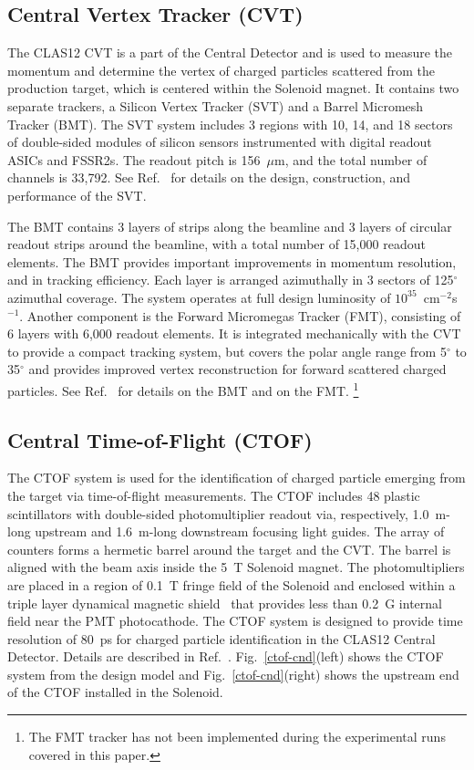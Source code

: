 \documentclass[final,3p,twocolumn]{elsarticle}
\begin{document}
\subsection{Central Vertex Tracker (CVT)}

The CLAS12 CVT is a part of the Central Detector and is used to measure the momentum and determine the vertex of
charged particles scattered from the production target, which is centered within the Solenoid magnet. It contains two
separate trackers, a Silicon Vertex Tracker (SVT) and a Barrel Micromesh Tracker  (BMT). The SVT system includes
3 regions with 10, 14, and 18 sectors of double-sided modules of silicon sensors instrumented with digital readout ASICs
and FSSR2s. The readout pitch is 156~$\mu$m, and the total number of channels is 33,792. See Ref.~\cite{SVT} for
details on the design, construction, and performance of the SVT.

The BMT contains 3 layers of strips along the beamline and 3 layers of circular readout strips around the beamline, with
a total number of 15,000 readout elements. The BMT provides important improvements in momentum resolution, and in
tracking efficiency. Each layer is arranged azimuthally in 3 sectors of 125$^\circ$ azimuthal coverage. The system
operates at full design luminosity of $10^{35}$~cm$^{-2}$s$^{-1}$. Another component is the Forward Micromegas Tracker
(FMT), consisting of 6 layers with 6,000 readout elements. It  is integrated mechanically with the CVT to provide a compact
tracking system, but covers the polar angle range from 5$^\circ$ to 35$^\circ$ and provides improved vertex reconstruction
for forward scattered charged particles. See Ref.~\cite{BMT} for details on the BMT and on the FMT. \footnote{The FMT tracker has not been implemented during the experimental runs covered in this paper.}  



\subsection{Central Time-of-Flight (CTOF)}

The CTOF system is used for the identification of charged particle emerging from the target via time-of-flight
measurements. The CTOF includes 48 plastic scintillators with double-sided photomultiplier readout via, respectively,
1.0~m-long upstream and 1.6~m-long downstream focusing light guides. The array of counters forms a hermetic barrel
around the target and the CVT. The barrel is aligned with the beam axis inside the 5~T Solenoid magnet. The 
photomultipliers are placed in a region of 0.1~T fringe field of the Solenoid and enclosed within a triple layer dynamical
magnetic shield~\cite{Baturin:2012zz} that provides less than 0.2~G internal field near the PMT photocathode. The
CTOF system is designed to provide time resolution of 80~ps for charged particle identification in the CLAS12 Central
Detector. Details are described in Ref.~\cite{CTOF}. Fig.~\ref{ctof-cnd}(left) shows the CTOF system from the design
model and Fig.~\ref{ctof-cnd}(right) shows the upstream end of the CTOF installed in the Solenoid.
\end{document}
